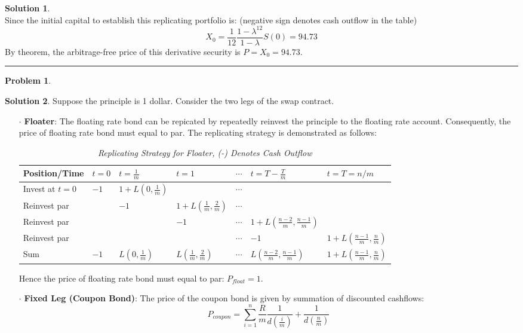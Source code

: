\documentclass[a4paper, 10pt]{article}
\renewcommand{\arraystretch}{1.4}
\theoremstyle{definition}
\newtheorem{problem}{Problem}
\theoremstyle{hSol}
\newtheorem*{solution}{Solution}
\begin{document}
\begin{solution}
~\\
Since the initial capital to establish this replicating portfolio is: (negative sign denotes cash outflow in the table)
$$
X_0 = \frac{1}{12}\frac{1- \lambda^{12}}{1- \lambda}S(0) = 94.73
$$
By theorem, the arbitrage-free price of this derivative security is $P = X_0 = 94.73$.
\end{solution}

\noindent\rule{16cm}{0.4pt}
\begin{problem} 
\end{problem}
\begin{solution} Suppose the principle is 1 dollar. Consider the two legs of the swap contract.
\begin{itemize}
  \item[$\cdot$] \textbf{Floater}: The floating rate bond can be repicated by repeatedly reinvest the principle to the floating rate account. Consequently, the price of floating rate bond must equal to par. The replicating strategy is demonstrated as follows:
  \begin{table}[H]
  \scriptsize
  \vspace{-10pt}
  \caption{\textit{Replicating Strategy for Floater, (-) Denotes Cash Outflow}}
  \vspace{3pt}
  \centering
  \def\arraystretch{2}
  \begin{tabular}{|m{2cm}|m{1.6cm}|m{1.6cm}|m{1.6cm}|m{1.6cm}|m{2cm}|m{2cm}|}
  \hline
  Position/Time &$t=0$ & $t=\tfrac{1}{m}$ & $t=1$ & $\cdots$&$t=T-\frac{T}{m}$ & $t=T=n/m$\\ 
  \hline
  Invest at $t=0$ &$-1$ & $1+L(0,\tfrac{1}{m})$ & & $\cdots$ &  & \\ 
  Reinvest par & & $-1$ & $1+L(\tfrac{1}{m},\tfrac{2}{m})$ & $\cdots$&  & \\ 
  Reinvest par & &  & $-1$ & $\cdots$& $1+L(\tfrac{n-2}{m},\tfrac{n-1}{m})$ & \\ 
  Reinvest par & &  &  & $\cdots$& $-1$ & $1+L(\tfrac{n-1}{m},\tfrac{n}{m})$\\ 
  \hline
  Sum & $-1$ & $L(0,\tfrac{1}{m})$& $L(\tfrac{1}{m},\tfrac{2}{m})$& $\cdots$& $L(\tfrac{n-2}{m},\tfrac{n-1}{m})$& $1+L(\tfrac{n-1}{m},\tfrac{n}{m})$\\
  \hline
  \end{tabular}
  \label{tab:rep3}
  \end{table}
  Hence the price of floating rate bond must equal to par: $P_{float} = 1$.
  \item[$\cdot$] \textbf{Fixed Leg (Coupon Bond)}: The price of the coupon bond is given by summation of discounted cashflows:
  $$
  P_{coupon} = \sum_{i=1}^n \frac{R}{m} \frac{1}{d(\tfrac{i}{m})} + \frac{1}{d(\tfrac{n}{m})}
  $$
\end{itemize}


\end{solution}
\end{document}
